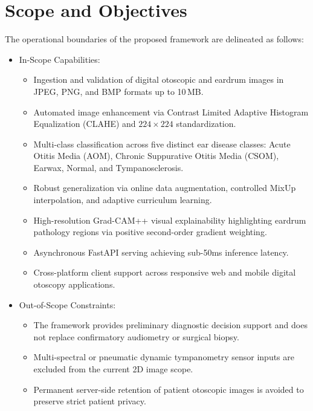 \documentclass[12pt,a4paper]{report}
\renewcommand{\textbf}[1]{#1}
\begin{document}
\section{Scope and Objectives}
The operational boundaries of the proposed framework are delineated as follows:
\begin{itemize}
    \item \textbf{In-Scope Capabilities:}
    \begin{itemize}
        \item Ingestion and validation of digital otoscopic and eardrum images in JPEG, PNG, and BMP formats up to 10\,MB.
        \item Automated image enhancement via Contrast Limited Adaptive Histogram Equalization (CLAHE) and $224 \times 224$ standardization.
        \item Multi-class classification across five distinct ear disease classes: \textbf{Acute Otitis Media (AOM)}, \textbf{Chronic Suppurative Otitis Media (CSOM)}, \textbf{Earwax}, \textbf{Normal}, and \textbf{Tympanosclerosis}.
        \item Robust generalization via online data augmentation, controlled MixUp interpolation, and adaptive curriculum learning.
        \item High-resolution Grad-CAM++ visual explainability highlighting eardrum pathology regions via positive second-order gradient weighting.
        \item Asynchronous FastAPI serving achieving sub-50ms inference latency.
        \item Cross-platform client support across responsive web and mobile digital otoscopy applications.
    \end{itemize}
    \item \textbf{Out-of-Scope Constraints:}
    \begin{itemize}
        \item The framework provides preliminary diagnostic decision support and does not replace confirmatory audiometry or surgical biopsy.
        \item Multi-spectral or pneumatic dynamic tympanometry sensor inputs are excluded from the current 2D image scope.
        \item Permanent server-side retention of patient otoscopic images is avoided to preserve strict patient privacy.
    \end{itemize}
\end{itemize}
\end{document}

